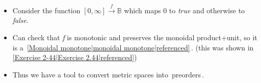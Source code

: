 
\begin{itemize}
    \item Consider the function $[0,\infty] \xrightarrow{f} \mathbb{B}$ which maps 0 to \emph{true} and otherwise to \emph{false}.
    \item Can check that \emph{f} is monotonic and preserves the monoidal product+unit, so it is a \,\ref{Monoidal monotone|monoidal monotone|referenced}\,. (this was shown in \ref{Exercise 2-44|Exercise 2.44|referenced})
    \item Thus we have a tool to convert metric spaces into \,preorders\,.
  \end{itemize}